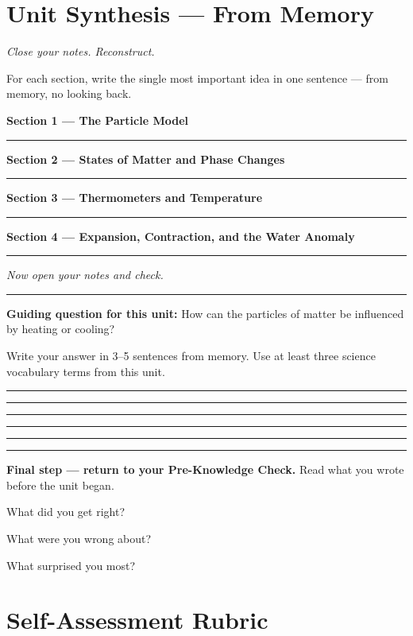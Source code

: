 \documentclass[11pt, a4paper]{article}
\newcommand{\blank}[1]{\underline{\hspace{#1}}}
\newcommand{\answerline}{\par\vspace{0.45cm}\noindent\rule{\linewidth}{0.4pt}\par\vspace{0.1cm}}
\begin{document}
\clearpage

\section*{Unit Synthesis --- From Memory}

\textit{Close your notes. Reconstruct.}

\medskip
For each section, write the single most important idea in one sentence --- from memory, no looking back.

\medskip
\textbf{Section 1 --- The Particle Model}
\answerline

\medskip
\textbf{Section 2 --- States of Matter and Phase Changes}
\answerline

\medskip
\textbf{Section 3 --- Thermometers and Temperature}
\answerline

\medskip
\textbf{Section 4 --- Expansion, Contraction, and the Water Anomaly}
\answerline

\medskip
\textit{Now open your notes and check.}

\medskip\noindent\rule{\linewidth}{0.4pt}\medskip

\textbf{Guiding question for this unit:} How can the particles of matter be influenced by heating or cooling?

Write your answer in 3--5 sentences from memory. Use at least three science vocabulary terms from this unit.

\answerline\answerline\answerline\answerline\answerline

\medskip\noindent\rule{\linewidth}{0.4pt}\medskip

\textbf{Final step --- return to your Pre-Knowledge Check.} Read what you wrote before the unit began.

\medskip
What did you get right? \blank{10cm}

\medskip
What were you wrong about? \blank{9.5cm}

\medskip
What surprised you most? \blank{9.5cm}

\clearpage

\section*{Self-Assessment Rubric}
\end{document}
